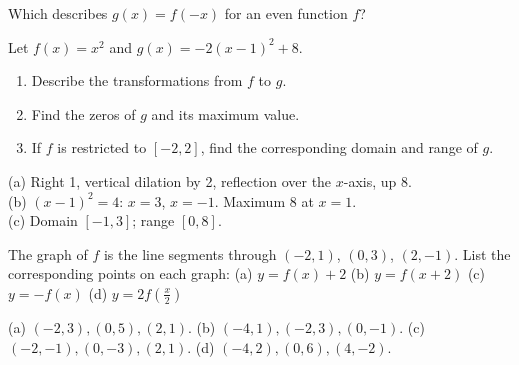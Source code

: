 \begin{exo}{}
Which describes $g(x)=f(-x)$ for an even function $f$?
\end{exo}
\begin{exo}{}
Let $f(x)=x^2$ and $g(x)=-2(x-1)^2+8$.
\begin{enumerate}[label=(\alph*)]
\item Describe the transformations from $f$ to $g$.
\item Find the zeros of $g$ and its maximum value.
\item If $f$ is restricted to $[-2,2]$, find the corresponding domain and range of $g$.
\end{enumerate}
\begin{solution}
(a) Right 1, vertical dilation by 2, reflection over the $x$-axis, up 8.\\
(b) $(x-1)^2=4$: $x=3$, $x=-1$. Maximum $8$ at $x=1$.\\
(c) Domain $[-1,3]$; range $[0,8]$.
\end{solution}
\end{exo}
\begin{exo}{}
The graph of $f$ is the line segments through $(-2,1)$, $(0,3)$, $(2,-1)$. List the corresponding points on each graph:
(a) $y=f(x)+2$ \quad (b) $y=f(x+2)$ \quad (c) $y=-f(x)$ \quad (d) $y=2f\!\left(\frac{x}{2}\right)$
\begin{solution}
(a) $(-2,3),(0,5),(2,1)$. (b) $(-4,1),(-2,3),(0,-1)$. (c) $(-2,-1),(0,-3),(2,1)$. (d) $(-4,2),(0,6),(4,-2)$.
\end{solution}
\end{exo}

